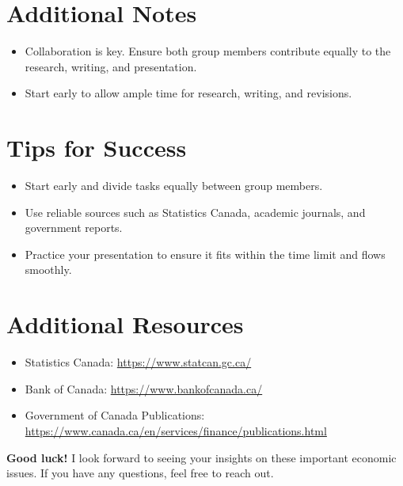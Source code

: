 \documentclass[12pt]{article}
\begin{document}
\section*{Additional Notes}
\begin{itemize}
    \item Collaboration is key. Ensure both group members contribute equally to the research, writing, and presentation.
    \item Start early to allow ample time for research, writing, and revisions.
 
\end{itemize}


\section*{Tips for Success}
\begin{itemize}
    \item Start early and divide tasks equally between group members.
    \item Use reliable sources such as Statistics Canada, academic journals, and government reports.
    \item Practice your presentation to ensure it fits within the time limit and flows smoothly.

\end{itemize}

\section*{Additional Resources}
\begin{itemize}
    \item Statistics Canada: \url{https://www.statcan.gc.ca/}
    \item Bank of Canada: \url{https://www.bankofcanada.ca/}
    \item Government of Canada Publications: \url{https://www.canada.ca/en/services/finance/publications.html}
\end{itemize}



\vspace{2cm}
\centering
\textbf{Good luck!} I look forward to seeing your insights on these important economic issues. If you have any questions, feel free to reach out.
\end{document}
